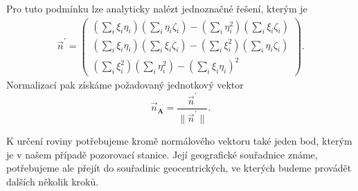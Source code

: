 Pro tuto podmínku lze analyticky nalézt jednoznačné řešení, kterým je \cite{ceplecha}
\begin{equation}
    \begin{aligned}
        \vec{n}^\prime=\begin{pmatrix}
                           \left( \sum_{i}{\xi_i\eta_i} \right)\left( \sum_{i}{\eta_i\zeta_i} \right)-\left( \sum_{i}{\eta_i^2} \right)\left( \sum_{i}{\xi_i\zeta_i} \right) \\
                           \left( \sum_{i}{\xi_i\eta_i} \right)\left( \sum_{i}{\xi_i\zeta_i} \right)-\left( \sum_{i}{\xi_i^2} \right)\left( \sum_{i}{\eta_i\zeta_i} \right)  \\
                           \left( \sum_{i}{\xi_i^2} \right)\left( \sum_{i}{\eta_i^2} \right)-\left( \sum_{i}{\xi_i\eta_i} \right)^2
                       \end{pmatrix}\text{.}
    \end{aligned}
\end{equation}
Normalizací pak získáme požadovaný jednotkový vektor
\begin{equation}
    \vec{n}_\mathbf{A}=\frac{\vec{n}^\prime}{\lVert \vec{n}^\prime \rVert }\text{.}
\end{equation}

\smallskip

K určení roviny potřebujeme kromě normálového vektoru také jeden bod, kterým je v našem případě pozorovací stanice. Její geografické souřadnice známe, potřebujeme ale přejít do souřadinic geocentrických, ve kterých budeme provádět dalších několik kroků.

